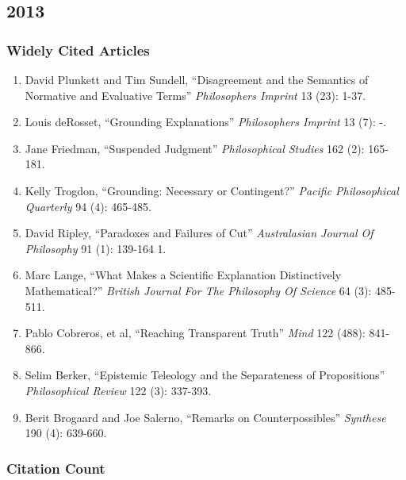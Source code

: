 \documentclass[
  10pt,
  letterpaper,
  DIV=11,
  numbers=noendperiod,
  twoside]{scrartcl}
\providecommand{\tightlist}{%
  \setlength{\itemsep}{0pt}\setlength{\parskip}{0pt}}\usepackage{longtable,booktabs,array}
\begin{document}
\newpage

\subsection{2013}\label{section-37}

\subsubsection*{Widely Cited Articles}\label{widely-cited-articles-37}

\begin{enumerate}
\def\labelenumi{\arabic{enumi}.}
\tightlist
\item
  David Plunkett and Tim Sundell, ``Disagreement and the Semantics of
  Normative and Evaluative Terms'' \emph{Philosophers Imprint} 13 (23):
  1-37.
\item
  Louis deRosset, ``Grounding Explanations'' \emph{Philosophers Imprint}
  13 (7): -.
\item
  Jane Friedman, ``Suspended Judgment'' \emph{Philosophical Studies} 162
  (2): 165-181.
\item
  Kelly Trogdon, ``Grounding: Necessary or Contingent?'' \emph{Pacific
  Philosophical Quarterly} 94 (4): 465-485.
\item
  David Ripley, ``Paradoxes and Failures of Cut'' \emph{Australasian
  Journal Of Philosophy} 91 (1): 139-164 1.
\item
  Marc Lange, ``What Makes a Scientific Explanation Distinctively
  Mathematical?'' \emph{British Journal For The Philosophy Of Science}
  64 (3): 485-511.
\item
  Pablo Cobreros, et al, ``Reaching Transparent Truth'' \emph{Mind} 122
  (488): 841-866.
\item
  Selim Berker, ``Epistemic Teleology and the Separateness of
  Propositions'' \emph{Philosophical Review} 122 (3): 337-393.
\item
  Berit Brogaard and Joe Salerno, ``Remarks on Counterpossibles''
  \emph{Synthese} 190 (4): 639-660.
\end{enumerate}

\subsubsection*{Citation Count}\label{citation-count-37}
\end{document}
